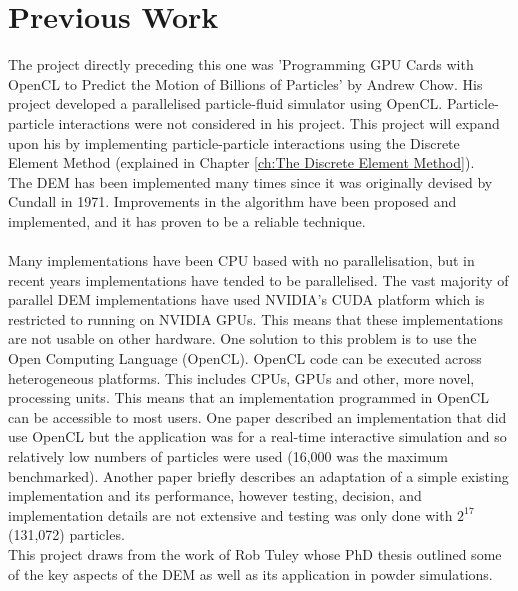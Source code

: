 \documentclass[10pt,a4paper,titlepage]{report}
\begin{document}
\section{Previous Work}
The project directly preceding this one was 'Programming GPU Cards with OpenCL to Predict the Motion of Billions of Particles'\cite{achow} by Andrew Chow. His project developed a parallelised particle-fluid simulator using OpenCL. Particle-particle interactions were not considered in his project. This project will expand upon his by implementing particle-particle interactions using the Discrete Element Method (explained in Chapter \ref{ch:The Discrete Element Method}).
\\The DEM has been implemented many times since it was originally devised by Cundall in 1971\cite{cundallphd}. Improvements in the algorithm have been proposed and implemented, and it has proven to be a reliable technique.
\\\\Many implementations have been CPU based with no parallelisation, but in recent years implementations have tended to be parallelised. The vast majority of parallel DEM implementations\cite{blazedem}\cite{GAN20161172}\cite{demcuda1}\cite{demcuda2}\cite{demcuda3} have used NVIDIA's CUDA platform which is restricted to running on NVIDIA GPUs. This means that these implementations are not usable on other hardware. One solution to this problem is to use the Open Computing Language (OpenCL). OpenCL code can be executed across heterogeneous platforms. This includes CPUs, GPUs and other, more novel, processing units. This means that an implementation programmed in OpenCL can be accessible to most users. One paper described an implementation that did use OpenCL but the application was for a real-time interactive simulation and so relatively low numbers of particles were used (16,000 was the maximum benchmarked)\cite{kinect}. Another paper briefly describes an adaptation of a simple existing implementation and its performance, however testing, decision, and implementation details are not extensive and testing was only done with $2^{17}$ (131,072) particles\cite{washizawa}.
\\This project draws from the work of Rob Tuley whose PhD thesis\cite{tuley} outlined some of the key aspects of the DEM as well as its application in powder simulations.
\end{document}
